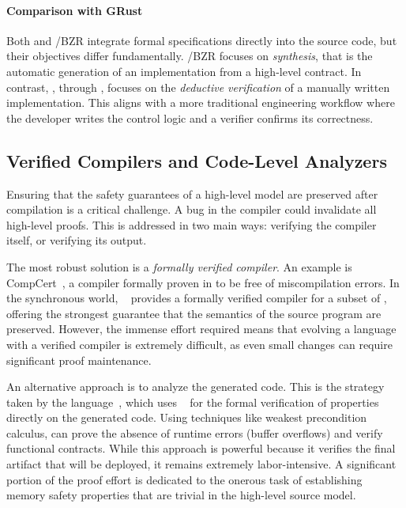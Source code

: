 \paragraph*{Comparison with GRust}
Both \GRust and \Heptagon/BZR integrate formal specifications directly into the source code, but
their objectives differ fundamentally. \Heptagon/BZR focuses on \emph{synthesis}, that is the
automatic generation of an implementation from a high-level contract. In contrast, \GRust, through
\GReusot, focuses on the \emph{deductive verification} of a manually written implementation. This
aligns with a more traditional engineering workflow where the developer writes the control logic and
a verifier confirms its correctness.

\subsection{Verified Compilers and Code-Level Analyzers}
\label{sec:sota:verification:compilers}

Ensuring that the safety guarantees of a high-level model are preserved after compilation is a
critical challenge. A bug in the compiler could invalidate all high-level proofs. This is addressed
in two main ways: verifying the compiler itself, or verifying its output.

The most robust solution is a \emph{formally verified compiler}. An example is
CompCert~\cite{compcert}, a \Ci compiler formally proven in \Rocq to be free of miscompilation
errors. In the synchronous world, \Velus~\cite{velus} provides a formally verified compiler for a
subset of \Lustre, offering the strongest guarantee that the semantics of the source program are
preserved. However, the immense effort required means that evolving a language with a verified
compiler is extremely difficult, as even small changes can require significant proof maintenance.

An alternative approach is to analyze the generated code. This is the strategy taken by the \LustreC
language~\cite{lustrec}, which uses \FramaC~\cite{framac} for the formal verification of properties
directly on the generated \Ci code. Using techniques like weakest precondition calculus, \FramaC can
prove the absence of runtime errors (\eg buffer overflows) and verify functional contracts. While
this approach is powerful because it verifies the final artifact that will be deployed, it remains
extremely labor-intensive. A significant portion of the proof effort is dedicated to the onerous
task of establishing memory safety properties that are trivial in the high-level source model.

